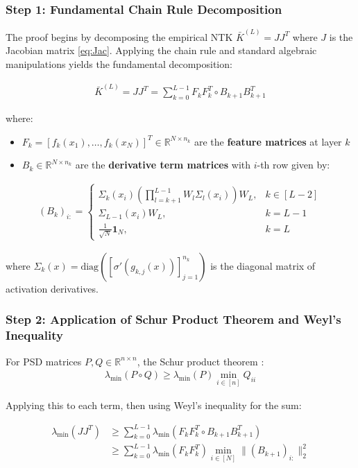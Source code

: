 \documentclass{article}
\newcommand{\R}{\mathbb{R}}
\newcommand{\evmin}[1]{\lambda_{\min}\left(#1\right)}
\begin{document}
\subsubsection{Step 1: Fundamental Chain Rule Decomposition}

The proof begins by decomposing the empirical NTK $\bar{K}^{(L)} = JJ^T$ where $J$ is the Jacobian matrix \eqref{eq:Jac}. Applying the chain rule and standard algebraic manipulations yields the fundamental decomposition:

\begin{align}
\bar{K}^{(L)} = JJ^T = \sum_{k=0}^{L-1} F_k F_k^T \circ B_{k+1} B_{k+1}^T
\end{align}

where:
\begin{itemize}
    \item $F_k = [f_k(x_1), \ldots, f_k(x_N)]^T \in \R^{N \times n_k}$ are the \textbf{feature matrices} at layer $k$
    \item $B_k \in \R^{N \times n_k}$ are the \textbf{derivative term matrices} with $i$-th row given by:
\end{itemize}

\begin{align}
(B_k)_{i:} = \begin{cases}
\Sigma_k(x_i) \left(\prod_{l=k+1}^{L-1} W_l \Sigma_l(x_i)\right) W_L, & k \in [L-2] \\
\Sigma_{L-1}(x_i) W_L, & k = L-1 \\
\frac{1}{\sqrt{N}} \mathbf{1}_N, & k = L
\end{cases}
\end{align}

where $\Sigma_k(x) = \text{diag}([\sigma'(g_{k,j}(x))]_{j=1}^{n_k})$ is the diagonal matrix of activation derivatives.

\subsubsection{Step 2: Application of Schur Product Theorem and Weyl's Inequality}

For PSD matrices $P, Q \in \R^{n \times n}$, the Schur product theorem :
\begin{align}
\evmin{P \circ Q} \geq \evmin{P} \min_{i \in [n]} Q_{ii}
\end{align}

Applying this to each term, then using Weyl's inequality for the sum:

\begin{align}
\evmin{JJ^T} &\geq \sum_{k=0}^{L-1} \evmin{F_k F_k^T \circ B_{k+1} B_{k+1}^T} \\
&\geq \sum_{k=0}^{L-1} \evmin{F_k F_k^T} \min_{i \in [N]} \|(B_{k+1})_{i:}\|_2^2
\end{align}
\end{document}
